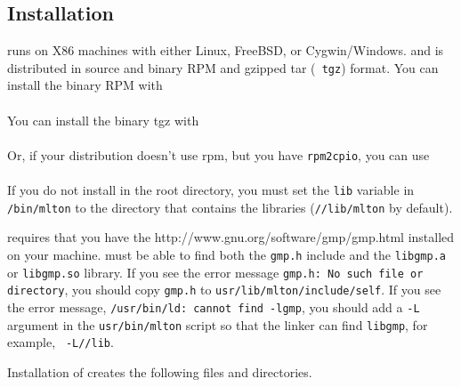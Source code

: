 
\subsection{Installation}

{\mlton} runs on X86 machines with either Linux, FreeBSD, or Cygwin/Windows.
and is distributed in source and binary RPM and gzipped tar ({\tt
tgz}) format.  You can install the binary RPM with\\
\hspace*{2em}{\tt rpm -i mlton-\version-1.i386.rpm}\\
You can install the binary tgz with\\
\hspace*{2em}{\tt zcat mlton-\version-1.i386-linux.tgz | tar x}\\
Or, if your distribution doesn't use rpm, but you have {\tt rpm2cpio},
you can use\\
\hspace*{2em}{\tt rpm2cpio mlton-\version-1.i386.rpm | cpio -id}\\
If you do not install {\mlton} in the root directory, you must
set the {\tt lib} variable in {\tt \prefix/bin/mlton} to the
directory that contains the libraries ({\tt /\prefix/lib/mlton} by
default).

{\mlton} requires that you have the
		  {http://www.gnu.org/software/gmp/gmp.html}
installed on your machine.  {\mlton} must be able to find both the
{\tt gmp.h} include and the {\tt libgmp.a} or {\tt libgmp.so} library.
If you see the error message {\tt gmp.h: No such file or directory},
you should copy {\tt gmp.h} to {\tt usr/lib/mlton/include/self}.  If
you see the error message, {\tt /usr/bin/ld: cannot find -lgmp}, you
should add a {\tt -L} argument in the {\tt usr/bin/mlton} script so
that the linker can find {\tt libgmp}, for example, {\tt
-L/\prefix/lib}.

Installation of {\mlton} creates the following files and directories.

\newcommand{\place}[1]{\item[\tt #1]\hspace{1in}\\}

